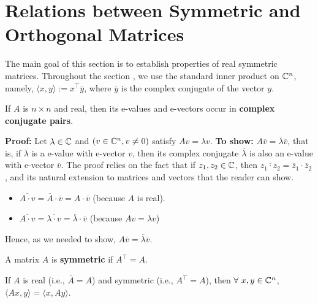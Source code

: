\section{Relations between Symmetric and Orthogonal Matrices}

The main goal of this section is to establish properties of real symmetric matrices. Throughout the section , we  use the standard inner product on $\mathbb C^n$, namely, $\langle x, y \rangle := x^\top \overline{y}$, where $\overline{y}$ is the complex conjugate of the vector $y$.
  
\begin{prop}
If $A$ is $n \times n$ and real, then its e-values and e-vectors occur in \textbf{complex conjugate pairs}.
\end{prop} 

\textbf{Proof:} Let $\lambda \in \mathbb C$ and $(v \in \mathbb C^n, v \neq 0)$ satisfy $Av = \lambda v$. \textbf{To show:} $A \overline{v} = \overline{\lambda} \overline{v}$, that is, if $\lambda$ is a e-value with e-vector $v$, then its complex conjugate $\overline{\lambda}$ is also an e-value with e-vector $\overline{v}$. The proof relies on the fact that if $z_1, z_2 \in \mathbb C$, then $\overline{z_1 \cdot z_2} = \overline{z}_1 \cdot \overline{z}_2$, and its natural extension to matrices and vectors that the reader can show. 
\begin{itemize}
    \item $\overline{A \cdot v}  = \overline{A} \cdot  \overline{v} = A \cdot \overline{v}$ (because $A$ is real).
    \item $\overline{A \cdot v}  = \overline{\lambda \cdot v} = \overline{\lambda} \cdot \overline{v}$ (because $Av = \lambda v$)
\end{itemize}
Hence, as we needed to show, $A \overline{v} = \overline{\lambda} \overline{v}$.
\Qed



\begin{definition}
 A matrix $A$ is \textbf{symmetric} if $A^\top = A$.
\end{definition} 

\begin{prop}
\label{prop:EvaluesReal01}
 If $A$ is real (i.e., $\overline{A} = A$) and symmetric (i.e., $A^\top = A$), then $\forall~x, y \in \mathbb C^n$, $\langle Ax, y\rangle = \langle x, Ay \rangle$.
\end{prop}

